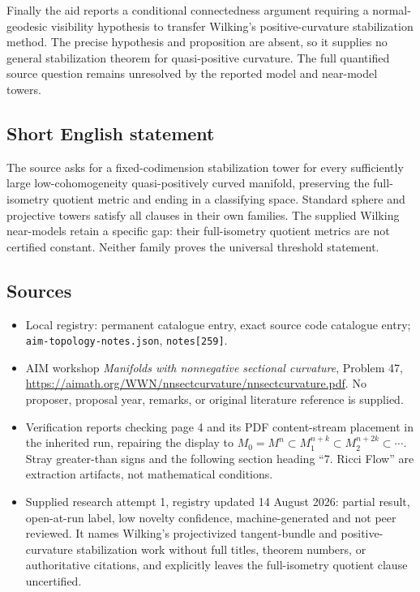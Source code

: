 \documentclass[11pt]{article}
\begin{document}
Finally the aid reports a conditional connectedness argument requiring a normal-geodesic visibility hypothesis to transfer Wilking's positive-curvature stabilization method. The precise hypothesis and proposition are absent, so it supplies no general stabilization theorem for quasi-positive curvature. The full quantified source question remains unresolved by the reported model and near-model towers.
\subsection{Short English statement}
The source asks for a fixed-codimension stabilization tower for every sufficiently large low-cohomogeneity quasi-positively curved manifold, preserving the full-isometry quotient metric and ending in a classifying space. Standard sphere and projective towers satisfy all clauses in their own families. The supplied Wilking near-models retain a specific gap: their full-isometry quotient metrics are not certified constant. Neither family proves the universal threshold statement.
\subsection{Sources}
\begin{itemize}
\item Local registry: permanent catalogue entry, exact source code catalogue entry; \texttt{aim-topology-notes.json}, \texttt{notes[259]}.
\item AIM workshop \emph{Manifolds with nonnegative sectional curvature}, Problem 47, \url{https://aimath.org/WWN/nnsectcurvature/nnsectcurvature.pdf}. No proposer, proposal year, remarks, or original literature reference is supplied.
\item Verification reports checking page 4 and its PDF content-stream placement in the inherited run, repairing the display to $M_0=M^n\subset M_1^{n+k}\subset M_2^{n+2k}\subset\cdots$. Stray greater-than signs and the following section heading ``7. Ricci Flow'' are extraction artifacts, not mathematical conditions.
\item Supplied research attempt 1, registry updated 14 August 2026: partial result, open-at-run label, low novelty confidence, machine-generated and not peer reviewed. It names Wilking's projectivized tangent-bundle and positive-curvature stabilization work without full titles, theorem numbers, or authoritative citations, and explicitly leaves the full-isometry quotient clause uncertified.
\end{itemize}
\end{document}
